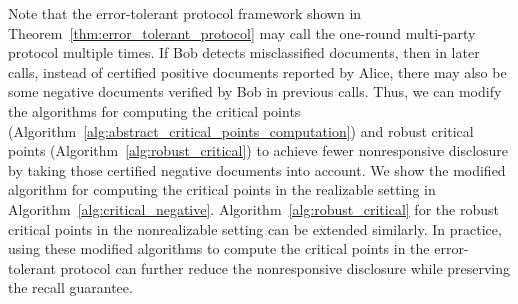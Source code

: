 

Note that the error-tolerant protocol framework shown in Theorem~\ref{thm:error_tolerant_protocol} may call the one-round multi-party protocol multiple times. 
If Bob detects misclassified documents, then in later calls, instead of certified positive documents reported by Alice, there may also be some negative documents verified by Bob in previous calls. 
Thus, we can modify the algorithms for computing the critical points (Algorithm~\ref{alg:abstract_critical_points_computation}) and robust critical points (Algorithm~\ref{alg:robust_critical}) to achieve fewer nonresponsive disclosure by taking those certified negative documents into account. 
We show the modified algorithm for computing the critical points in the realizable setting in Algorithm~\ref{alg:critical_negative}.
Algorithm~\ref{alg:robust_critical} for the robust critical points in the nonrealizable setting can be extended similarly.
In practice, using these modified algorithms to compute the critical points in the error-tolerant protocol can further reduce the nonresponsive disclosure while preserving the recall guarantee.